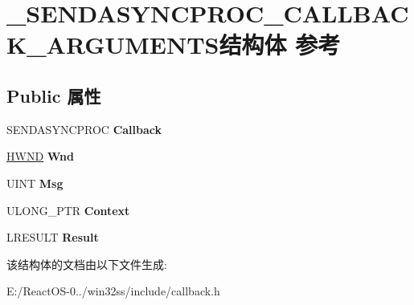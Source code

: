 \hypertarget{struct___s_e_n_d_a_s_y_n_c_p_r_o_c___c_a_l_l_b_a_c_k___a_r_g_u_m_e_n_t_s}{}\section{\+\_\+\+S\+E\+N\+D\+A\+S\+Y\+N\+C\+P\+R\+O\+C\+\_\+\+C\+A\+L\+L\+B\+A\+C\+K\+\_\+\+A\+R\+G\+U\+M\+E\+N\+T\+S结构体 参考}
\label{struct___s_e_n_d_a_s_y_n_c_p_r_o_c___c_a_l_l_b_a_c_k___a_r_g_u_m_e_n_t_s}
\subsection*{Public 属性}
\begin{DoxyCompactItemize}
\item 
\mbox{\label{struct___s_e_n_d_a_s_y_n_c_p_r_o_c___c_a_l_l_b_a_c_k___a_r_g_u_m_e_n_t_s_aaa5624682818311b16a181ded45d487b}} 
S\+E\+N\+D\+A\+S\+Y\+N\+C\+P\+R\+OC {\bfseries Callback}
\item 
\mbox{\label{struct___s_e_n_d_a_s_y_n_c_p_r_o_c___c_a_l_l_b_a_c_k___a_r_g_u_m_e_n_t_s_aa9815e54e4d8ac6a1be49144b6f81920}} 
\hyperlink{interfacevoid}{H\+W\+ND} {\bfseries Wnd}
\item 
\mbox{\label{struct___s_e_n_d_a_s_y_n_c_p_r_o_c___c_a_l_l_b_a_c_k___a_r_g_u_m_e_n_t_s_aa78bc8decff92117efc79ef490f4d84a}} 
U\+I\+NT {\bfseries Msg}
\item 
\mbox{\label{struct___s_e_n_d_a_s_y_n_c_p_r_o_c___c_a_l_l_b_a_c_k___a_r_g_u_m_e_n_t_s_a46f4c8eacb9382675f68492cd7608c4f}} 
U\+L\+O\+N\+G\+\_\+\+P\+TR {\bfseries Context}
\item 
\mbox{\label{struct___s_e_n_d_a_s_y_n_c_p_r_o_c___c_a_l_l_b_a_c_k___a_r_g_u_m_e_n_t_s_a8303e40e0d772cbac2f732b20bd1f3fe}} 
L\+R\+E\+S\+U\+LT {\bfseries Result}
\end{DoxyCompactItemize}


该结构体的文档由以下文件生成\+:\begin{DoxyCompactItemize}
\item 
E\+:/\+React\+O\+S-\/0../win32ss/include/callback.\+h\end{DoxyCompactItemize}
